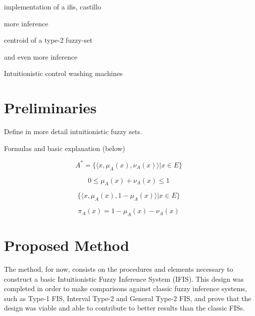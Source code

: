 \documentclass[conference]{IEEEtran}
\begin{document}
implementation of a ifis, castillo \cite{castillo2007intuitionistic}

more inference \cite{bustince1995method}

centroid of a type-2 fuzzy-set \cite{karnik2001centroid}

and even more inference \cite{marinov2005method}

Intuitionistic control washing machines \cite{akram2014intuitionistic}

\section{Preliminaries}

Define in more detail intuitionistic fuzzy sets. 

Formulas and basic explanation (below) \cite{atanassov2013intuitionistic}

\begin{equation}
  A^{*} = \{\langle x, \mu _{A} (x), \nu _{A} (x) \rangle | x \in E\}
\end{equation}

\begin{equation}
  \label{intuitionistic-interval}
  0 \leq \mu_{A}(x) + \nu_{A}(x) \leq 1
\end{equation}

\begin{equation}
  \label{ifs-form}
  \{ \langle x, \mu_{A}(x), 1 - \mu_{A}(x) \rangle | x \in E \}
\end{equation}

\begin{equation}
  \label{fs-as-ifs-if}
  \pi_{A}(x) = 1 - \mu_{A}(x) - \nu_{A}(x)
\end{equation}

\section{Proposed Method}

The method, for now, consists on the procedures and elements
necessary to construct a basic Intuitionistic Fuzzy Inference System
(IFIS). This design was completed in order to make comparisons against
classic fuzzy inference systems, such as Type-1 FIS, Interval
Type-2 and General Type-2 FIS, and prove that
the design was viable and able to contribute to better results than
the classic FISs.
\end{document}
